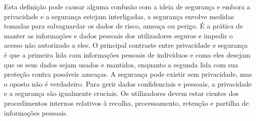\documentclass[conference]{IEEEtran}
\begin{document}

Esta definição pode causar alguma confusão com a ideia de segurança \cite{HIVDifference}
e embora a privacidade e a segurança estejam interligadas, a segurança envolve
medidas tomadas para salvaguardar os dados de risco, ameaça ou perigo. É a
prática de manter as informações e dados pessoais
dos utilizadores seguros e impedir o acesso não autorizado a eles. O principal contraste
entre privacidade e segurança é que a primeira lida com informações pessoais de
indivíduos e como eles desejam que os seus dados sejam usados e mantidos, enquanto
a segunda lida com sua proteção contra possíveis ameaças. A segurança pode existir
sem privacidade, mas o oposto não é verdadeiro. Para gerir dados confidenciais
e pessoais, a privacidade e a segurança são igualmente cruciais.
Os utilizadores devem estar cientes dos procedimentos internos relativos à recolha,
processamento, retenção e partilha de informações pessoais.
\end{document}
